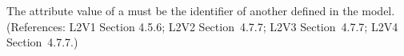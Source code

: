 The  attribute value of a \Compartment must be the identifier of
another \Compartment defined in the model.  (References: L2V1 Section
4.5.6; L2V2 Section~4.7.7; L2V3 Section~4.7.7; L2V4 Section~4.7.7.)

